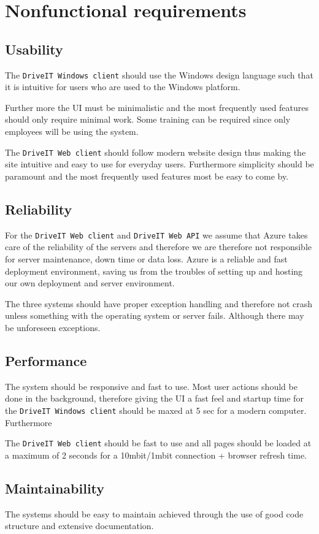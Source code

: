 \section{Nonfunctional requirements}
\subsection{Usability}
The \texttt{DriveIT Windows client} should use the Windows design language such that it is intuitive for users who are used to the Windows platform.

Further more the UI must be minimalistic and the most frequently used features should only require minimal work. Some training can be required since only employees will be using the system. 

The \texttt{DriveIT Web client} should follow modern website design thus making the site intuitive and easy to use for everyday users. Furthermore simplicity should be paramount and the most frequently used features most be easy to come by.

\subsection{Reliability}
For the \texttt{DriveIT Web client} and \texttt{DriveIT Web API} we assume that Azure takes care of the reliability of the servers and therefore we are therefore not responsible for server maintenance, down time or data loss. Azure is a reliable and fast deployment environment, saving us from the troubles of setting up and hosting our own deployment and server environment.

The three systems should have proper exception handling and therefore not crash unless something with the operating system or server fails. Although there may be unforeseen exceptions.

\subsection{Performance}
The system should be responsive and fast to use. Most user actions should be done in the background, therefore giving the UI a fast feel and startup time for the \texttt{DriveIT Windows client} should be maxed at 5 sec for a modern computer. Furthermore 

The \texttt{DriveIT Web client} should be fast to use and all pages should be loaded at a maximum of 2 seconds for a 10mbit/1mbit connection + browser refresh time.

\subsection{Maintainability}
The systems should be easy to maintain achieved through the use of good code structure and extensive documentation. 

